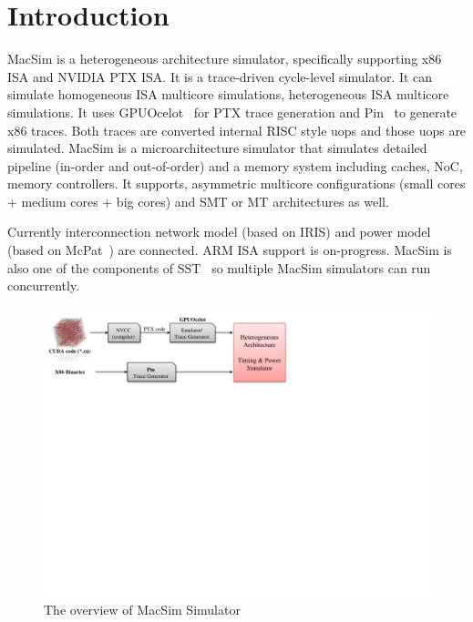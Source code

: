 


\chapter{Introduction}


MacSim is a heterogeneous architecture simulator, specifically
supporting x86 ISA and NVIDIA PTX ISA. It is a trace-driven
cycle-level simulator.  It can simulate homogeneous ISA multicore
simulations, heterogeneous ISA multicore simulations. It uses
GPUOcelot~\cite{ocelot} for PTX trace generation and Pin~\cite{pin} to
generate x86 traces. Both traces are converted internal RISC style
uops and those uops are simulated. MacSim is a microarchitecture
simulator that simulates detailed pipeline (in-order and out-of-order)
and a memory system including caches, NoC, memory controllers. It
supports, asymmetric multicore configurations (small cores + medium
cores + big cores) and SMT or MT architectures as well.

Currently interconnection network model (based on IRIS) and power
model (based on McPat~\cite{mcpat}) are connected. ARM ISA support is
on-progress. MacSim is also one of the components of SST~\cite{sst} so
multiple MacSim simulators can run concurrently.


\begin{figure}[htb]
\centering
\includegraphics{figs/macsim_overview}
\caption{The overview of MacSim Simulator}
\label{fig:overview}
\end{figure}

